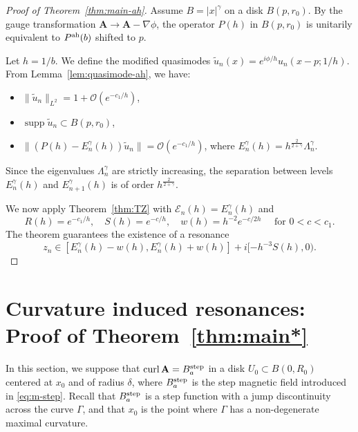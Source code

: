 \documentclass[11pt]{amsart}
\theoremstyle{remark}
\newcommand{\bA}{\mathbf{A}}
\DeclareMathOperator{\Curl}{curl}
\numberwithin{equation}{section}
\begin{document}
\begin{proof}[Proof of Theorem~\ref{thm:main-ah}]
Assume $B = |x|^\gamma$ on a disk $B(p, r_0)$. By the gauge transformation $\bA \to \bA - \nabla \phi$, the operator $P(h)$ in $B(p, r_0)$ is unitarily equivalent to $P^{\rm ah}(b)$ shifted to $p$.

Let $h = 1/b$. We define the modified quasimodes $\tilde{u}_n(x) = e^{i\phi/h} u_n(x-p; 1/h)$. From Lemma~\ref{lem:quasimode-ah}, we have:
\begin{itemize}
    \item $\|\tilde u_n\|_{L^2} = 1 + \mathcal{O}(e^{-c_1/h})$,
    \item $\operatorname{supp} \tilde u_n \subset B(p, r_0)$,
    \item $\|(P(h) - E_n^\gamma(h))\tilde u_n\| = \mathcal{O}(e^{-c_1/h})$, where $E_n^\gamma(h) = h^{\frac{2}{2+\gamma}} \Lambda_n^\gamma$.
\end{itemize}

Since the eigenvalues $\Lambda_n^\gamma$ are strictly increasing, the separation between levels $E_n^\gamma(h)$ and $E_{n+1}^\gamma(h)$ is of order $h^{\frac{2}{2+\gamma}}$. 



We now apply Theorem~\ref{thm:TZ} with $\mathcal E_n(h)=E_n^\gamma(h)$ and
\[R(h)=e^{-c_1/h},\quad S(h) = e^{-c/h},\quad  w(h) = h^{-2}e^{-c/2h}\quad\text{ for $0 < c < c_1$}.\]
The theorem guarantees the existence of a resonance
\[
z_n\in [E_n^\gamma(h) - w(h), E_n^\gamma(h) + w(h)] + i[-h^{-3}S(h), 0).
\]
\end{proof}



\section{Curvature induced resonances: Proof of Theorem~\ref{thm:main*}}\label{sec:step-f}

In this section, we suppose that $\Curl\bA=B_a^{\rm step}$ in a disk $U_0\subset B(0,R_0)$ centered at $x_0$ and of radius $\delta$, where $B_{a}^{\rm step}$ is the step magnetic field introduced in \eqref{eq:m-step}. Recall that $B_{a}^{\rm step}$ is a step function with a jump discontinuity across the curve $\Gamma$, and that $x_0$ is the point where $\Gamma$ has a non-degenerate maximal curvature.
\end{document}

